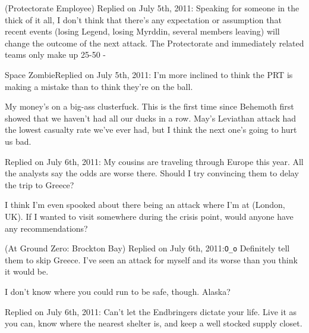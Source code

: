 


\blacktriangleright  {}(Protectorate Employee)
Replied on July 5th, 2011:
Speaking for someone in the thick of it all, I don't think that there's any expectation or assumption that recent events (losing Legend, losing Myrddin, several members leaving) will change the outcome of the next attack.  The Protectorate and immediately related teams only make up 25-50%
-\Mercury



\blacktriangleright  Space ZombieReplied on July 5th, 2011:
I'm more inclined to think the PRT is making a mistake than to think they're on the ball.



My money's on a big-ass clusterfuck.  This is the first time since Behemoth first showed that we haven't had all our ducks in a row.  May's Leviathan attack had the lowest casualty rate we've ever had, but I think the next one's going to hurt us bad.



\blacktriangleright  {}
Replied on July 6th, 2011:
My cousins are traveling through Europe this year.  All the analysts say the odds are worse there.  Should I try convincing them to delay the trip to Greece?



I think I'm even spooked about there being an attack where I'm at (London, UK).  If I wanted to visit somewhere during the crisis point, would anyone have any recommendations?



\blacktriangleright  {} (At Ground Zero: Brockton Bay)
Replied on July 6th, 2011:\texttt{O_o}  Definitely tell them to skip Greece.  I've seen an attack for myself and its worse than you think it would be.



I don't know where you could run to be safe, though.  Alaska?



\blacktriangleright  {}
Replied on July 6th, 2011:
Can't let the Endbringers dictate your life.  Live it as you can, know where the nearest shelter is, and keep a well stocked supply closet.



